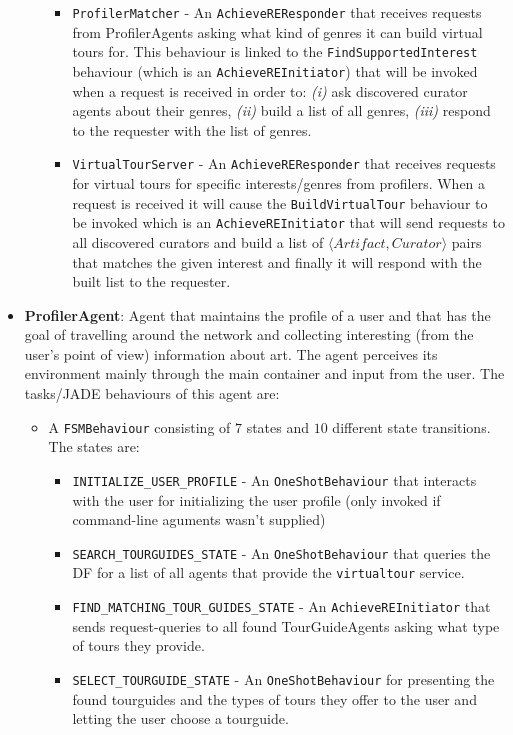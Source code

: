 \documentclass[a4paper, 11pt]{article}
\begin{document}
\begin{itemize}
\begin{itemize}
\begin{itemize}
\item \texttt{ProfilerMatcher} - An \texttt{AchieveREResponder} that receives requests from ProfilerAgents asking what kind of genres it can build virtual tours for. This behaviour is linked to the \texttt{FindSupportedInterest} behaviour (which is an \texttt{AchieveREInitiator}) that will be invoked when a request is received in order to: \textit{(i)} ask discovered curator agents about their genres, \textit{(ii)} build a list of all genres, \textit{(iii)} respond to the requester with the list of genres.
\item \texttt{VirtualTourServer} - An \texttt{AchieveREResponder} that receives requests for virtual tours for specific interests/genres from profilers. When a request is received it will cause the \texttt{BuildVirtualTour} behaviour to be invoked which is an \texttt{AchieveREInitiator} that will send requests to all discovered curators and build a list of $\langle Artifact, Curator\rangle$ pairs that matches the given interest and finally it will respond with the built list to the requester.
\end{itemize}
\end{itemize}
\item \textbf{ProfilerAgent}: Agent that maintains the profile of a user and that has the goal of travelling around the network and collecting interesting (from the user's point of view) information about art. The agent perceives its environment mainly through the main container and input from the user. The tasks/JADE behaviours of this agent are:
\begin{itemize}
\item A \texttt{FSMBehaviour} consisting of $7$ states and $10$ different state transitions. The states are:
\begin{itemize}
\item \texttt{INITIALIZE\_USER\_PROFILE} - An \texttt{OneShotBehaviour} that interacts with the user for initializing the user profile (only invoked if command-line aguments wasn't supplied)
\item \texttt{SEARCH\_TOURGUIDES\_STATE} - An \texttt{OneShotBehaviour} that queries the DF for a list of all agents that provide the \texttt{virtualtour} service.
\item \texttt{FIND\_MATCHING\_TOUR\_GUIDES\_STATE} - An \texttt{AchieveREInitiator} that sends request-queries to all found TourGuideAgents asking what type of tours they provide.
\item \texttt{SELECT\_TOURGUIDE\_STATE} - An \texttt{OneShotBehaviour} for presenting the found tourguides and the types of tours they offer to the user and letting the user choose a tourguide.

\end{itemize}
\end{itemize}
\end{itemize}
\end{document}
